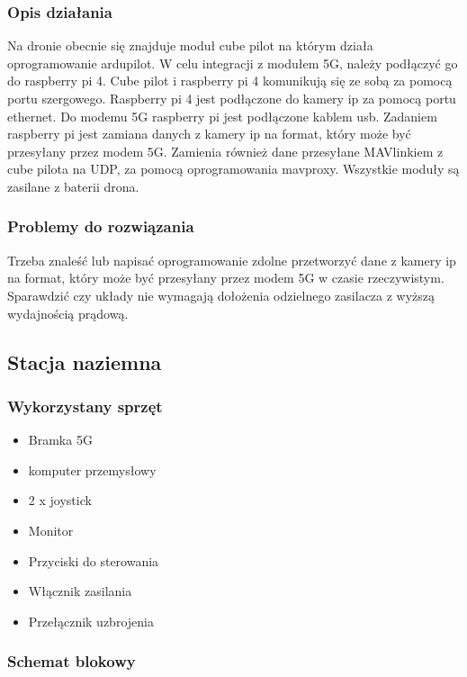 \documentclass{article}
\begin{document}
\subsubsection{Opis działania}
Na dronie obecnie się znajduje moduł cube pilot na którym działa oprogramowanie ardupilot. W celu integracji z modułem 5G, należy podłączyć go do raspberry pi 4.
Cube pilot i raspberry pi 4 komunikują się ze sobą za pomocą portu szergowego. Raspberry pi 4 jest podłączone do kamery ip za pomocą portu ethernet. Do modemu 5G raspberry pi jest podłączone kablem usb. 
Zadaniem raspberry pi jest zamiana danych z kamery ip na format, który może być przesyłany przez modem 5G. Zamienia również dane przesyłane MAVlinkiem z cube pilota na UDP, za pomocą oprogramowania mavproxy.
Wszystkie moduły są zasilane z baterii drona.

\subsubsection{Problemy do rozwiązania}
Trzeba znaleść lub napisać oprogramowanie zdolne przetworzyć dane z kamery ip na format, który może być przesyłany przez modem 5G w czasie rzeczywistym.
Sparawdzić czy układy nie wymagają dołożenia odzielnego zasilacza z wyższą wydajnością prądową.

\subsection{Stacja naziemna}
\subsubsection{Wykorzystany sprzęt}
\begin{itemize}
    \item Bramka 5G
    \item komputer przemysłowy
    \item 2 x joystick
    \item Monitor
    \item Przyciski do sterowania
    \item Włącznik zasilania
    \item Przełącznik uzbrojenia
\end{itemize}

\subsubsection{Schemat blokowy}
\end{document}
